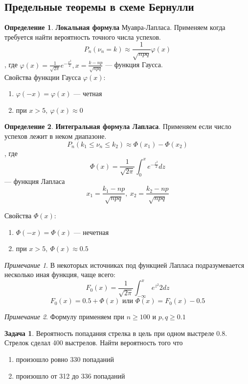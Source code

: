 \documentclass[english]{article}
\theoremstyle{plain}
\theoremstyle{remark}
\newtheorem*{remark}{Примечание}
\theoremstyle{definition}
\newtheorem{task}{Задача}
\newtheorem*{definition}{Определение}
\begin{document}
\subsection{Предельные теоремы в схеме Бернулли}
\label{sec:orgdee0d35}
\begin{definition}
\textbf{Локальная формула} Муавра-Лапласа. Применяем когда требуется найти вероятность точного числа успехов.
\[ P_n(\nu_n = k) \approx \frac{1}{\sqrt{npq}}\varphi(x) \]
, где \(\varphi(x) = \frac{1}{\sqrt{2\pi}}e^{-\frac{x^2}{2}}, x = \frac{k - np}{\sqrt{npq}}\) --- функция Гаусса. \\
Свойства функции Гаусса \(\varphi(x)\):
\begin{enumerate}
\item \(\varphi(-x) = \varphi(x)\) --- четная
\item при \(x > 5,\ \varphi(x) \approx 0\)
\end{enumerate}
\end{definition}
\begin{definition}
\textbf{Интегральная формула Лапласа}. Применяем если число успехов лежит в неком диапазоне.
\[ P_n(k_1 \le \nu_n \le k_2) \approx \Phi(x_1) - \Phi(x_2) \]
, где \[ \Phi(x) = \frac{1}{\sqrt{2\pi}} \int_0^x e^{-\frac{z^2}{2}} dz\] --- функция Лапласа \\
\[ x_1 = \frac{k_1 - np}{\sqrt{npq}},\ x_2 = \frac{k_2 - np}{\sqrt{npq}} \]

Свойства \(\Phi(x)\):
\begin{enumerate}
\item \(\Phi(-x) = \Phi(x)\) --- нечетная
\item при \(x > 5,\ \Phi(x) \approx 0.5\)
\end{enumerate}
\end{definition}
\begin{remark}
В некоторых источниках под функцией Лапласа подразумевается несколько иная функция, чаще всего:
\[ F_0(x) = \frac{1}{\sqrt{2\pi}} \int_{-\infty}^x e^{z^2}{2}dz \]
\[ F_0(x) = 0.5 + \Phi(x)\text{ или }\Phi(x) = F_0(x)-0.5 \]
\end{remark}
\begin{remark}
Формулу применяем при \(n \ge 100\) и \(p,q\ge0.1\) 
\end{remark}
\begin{task}
Вероятность попадания стрелка в цель при одном выстреле 0.8. Стрелок сделал 400 выстрелов. Найти вероятность того что
\begin{enumerate}
\item произошло ровно 330 попаданий
\item произошло от 312 до 336 попаданий
\end{enumerate}
\end{task}
\end{document}
